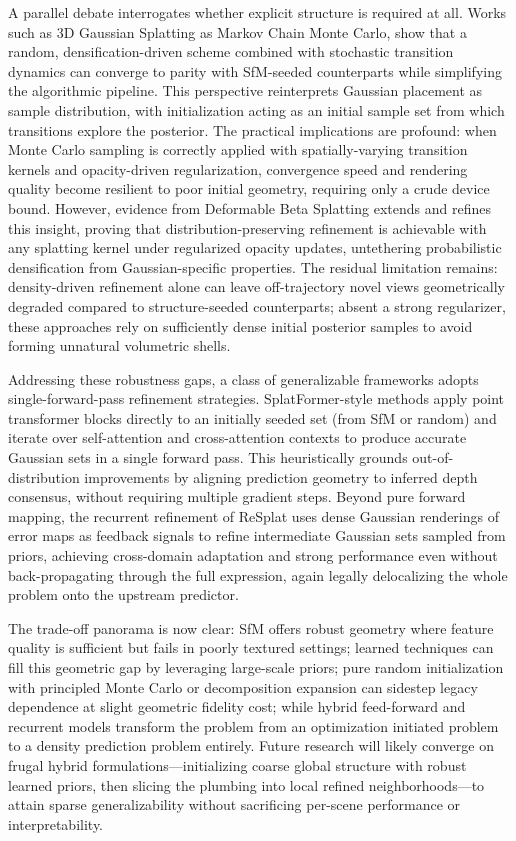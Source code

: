 \documentclass[11pt,a4paper]{article}
\begin{document}
A parallel debate interrogates whether explicit structure is required at all. Works such as 3D Gaussian Splatting as Markov Chain Monte Carlo, show that a random, densification-driven scheme combined with stochastic transition dynamics can converge to parity with SfM-seeded counterparts while simplifying the algorithmic pipeline. This perspective reinterprets Gaussian placement as sample distribution, with initialization acting as an initial sample set from which transitions explore the posterior. The practical implications are profound: when Monte Carlo sampling is correctly applied with spatially-varying transition kernels and opacity-driven regularization, convergence speed and rendering quality become resilient to poor initial geometry, requiring only a crude device bound. However, evidence from Deformable Beta Splatting extends and refines this insight, proving that distribution-preserving refinement is achievable with any splatting kernel under regularized opacity updates, untethering probabilistic densification from Gaussian-specific properties. The residual limitation remains: density-driven refinement alone can leave off-trajectory novel views geometrically degraded compared to structure-seeded counterparts; absent a strong regularizer, these approaches rely on sufficiently dense initial posterior samples to avoid forming unnatural volumetric shells.

Addressing these robustness gaps, a class of generalizable frameworks adopts single-forward-pass refinement strategies. SplatFormer-style methods apply point transformer blocks directly to an initially seeded set (from SfM or random) and iterate over self-attention and cross-attention contexts to produce accurate Gaussian sets in a single forward pass. This heuristically grounds out-of-distribution improvements by aligning prediction geometry to inferred depth consensus, without requiring multiple gradient steps. Beyond pure forward mapping, the recurrent refinement of ReSplat uses dense Gaussian renderings of error maps as feedback signals to refine intermediate Gaussian sets sampled from priors, achieving cross-domain adaptation and strong performance even without back-propagating through the full expression, again legally delocalizing the whole problem onto the upstream predictor.

The trade-off panorama is now clear: SfM offers robust geometry where feature quality is sufficient but fails in poorly textured settings; learned techniques can fill this geometric gap by leveraging large-scale priors; pure random initialization with principled Monte Carlo or decomposition expansion can sidestep legacy dependence at slight geometric fidelity cost; while hybrid feed-forward and recurrent models transform the problem from an optimization initiated problem to a density prediction problem entirely. Future research will likely converge on frugal hybrid formulations---initializing coarse global structure with robust learned priors, then slicing the plumbing into local refined neighborhoods---to attain sparse generalizability without sacrificing per-scene performance or interpretability.
\end{document}
